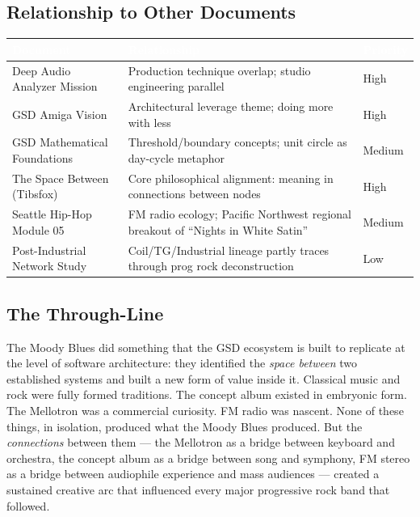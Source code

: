 \documentclass[11pt,letterpaper]{article}
\newcommand{\tableheader}[1]{\textbf{\sffamily\textcolor{white}{#1}}}
\begin{document}
\subsection{Relationship to Other Documents}

\begin{center}
\begin{tabularx}{\textwidth}{L{4cm}XC{2cm}}
\toprule
{}
\tableheader{Document} & \tableheader{Relationship} & \tableheader{Priority} \\
\midrule
Deep Audio Analyzer Mission & Production technique overlap; studio engineering parallel & High \\
GSD Amiga Vision & Architectural leverage theme; doing more with less & High \\
GSD Mathematical Foundations & Threshold/boundary concepts; unit circle as day-cycle metaphor & Medium \\
The Space Between (Tibsfox) & Core philosophical alignment: meaning in connections between nodes & High \\
Seattle Hip-Hop Module 05 & FM radio ecology; Pacific Northwest regional breakout of ``Nights in White Satin'' & Medium \\
Post-Industrial Network Study & Coil/TG/Industrial lineage partly traces through prog rock deconstruction & Low \\
\bottomrule
\end{tabularx}
\end{center}

\subsection{The Through-Line}

The Moody Blues did something that the GSD ecosystem is built to replicate at the level of software architecture: they identified the \textit{space between} two established systems and built a new form of value inside it. Classical music and rock were fully formed traditions. The concept album existed in embryonic form. The Mellotron was a commercial curiosity. FM radio was nascent. None of these things, in isolation, produced what the Moody Blues produced. But the \textit{connections} between them --- the Mellotron as a bridge between keyboard and orchestra, the concept album as a bridge between song and symphony, FM stereo as a bridge between audiophile experience and mass audiences --- created a sustained creative arc that influenced every major progressive rock band that followed.
\end{document}
